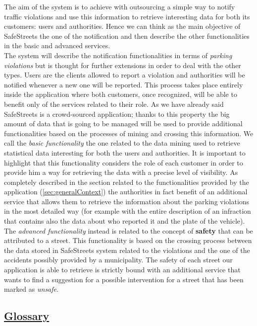 		The aim of the system is to achieve with outsourcing a simple way to notify traffic violations and use this information to retrieve interesting data for both its customers: users and authorities. Hence we can think as the main objective of SafeStreets the one of the notification and then describe the other functionalities in the basic and advanced services.\\
		
		The system will describe the notification functionalities in terms of \emph{parking violations} but is thought for further extensions in order to deal with the other types. Users are the clients allowed to report a violation and authorities will be notified whenever a new one will be reported. This process takes place entirely inside the application where both customers, once recognized, will be able to benefit only of the services related to their role. As we have already said SafeStreets is a crowd-sourced application; thanks to this property the big amount of data that is going to be managed will be used to provide additional functionalities based on the processes of mining and crossing this information. We call the \emph{basic functionality} the one related to the data mining used to retrieve statistical data interesting for both the users and authorities. It is important to highlight that this functionality considers the role of each customer in order to provide him a way for retrieving the data with a precise level of visibility. As completely described in the section related to the functionalities provided by the application (\ref{sec:generalContext}) the authorities in fact benefit of an additional service that allows them to retrieve the information about the parking violations in the most detailed way (for example with the entire description of an infraction that contains also the data about who reported it and the plate of the vehicle). The \emph{advanced functionality} instead is related to the concept of \textbf{safety} that can be attributed to a street. This functionality is based on the crossing process between the data stored in SafeStreets system related to the violations and the one of the accidents possibly provided by a municipality. The safety of each street our application is able to retrieve is strictly bound with an additional service that wants to find a suggestion for a possible intervention for a street that has been marked as \emph{unsafe}.
			
	\subsection[Glossary]{\hyperlink{toc}{Glossary}}
		\label{sec:glossary}
		
